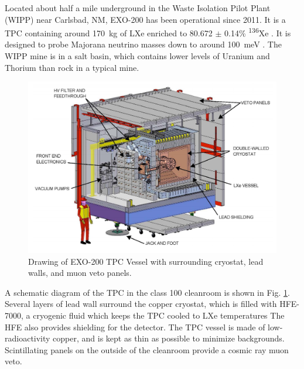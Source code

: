 Located about half a mile underground in the Waste Isolation Pilot Plant (WIPP) near Carlsbad, NM, EXO-200 has been operational since 2011.  It is a TPC containing around 170~kg of LXe enriched to 80.672 $\pm$ 0.14\% \textsuperscript{136}Xe \cite{EXO200TwoNuLong}. It is designed to probe Majorana neutrino masses down to around 100~meV \cite{EXO200instrumentationPart1}.  The WIPP mine is in a salt basin, which contains lower levels of Uranium and Thorium than rock in a typical mine.

\begin{figure} %
	\centering
	\includegraphics[width=.9\textwidth]{figures/cleanroom.png}
	\caption{Drawing of EXO-200 TPC Vessel with surrounding cryostat, lead walls, and muon veto panels.}
\label{fig:cleanroom}
\end{figure}

A schematic diagram of the TPC in the class 100 cleanroom is shown in Fig. \ref{fig:cleanroom}.  Several layers of lead wall surround the copper cryostat, which is filled with HFE-7000, a cryogenic fluid which keeps the TPC cooled to LXe temperatures  The HFE also provides shielding for the detector.  The TPC vessel is made of low-radioactivity copper, and is kept as thin as possible to minimize backgrounds.  Scintillating panels on the outside of the cleanroom provide a cosmic ray muon veto.


